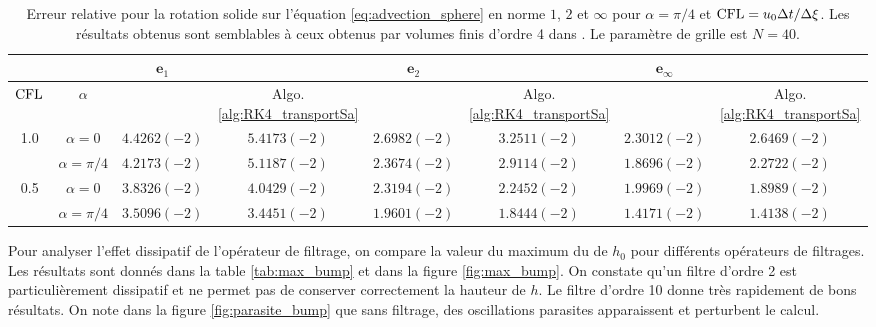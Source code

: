\begin{table}[htbp]
\begin{center}
\begin{tabular}{|cc||cc||cc||cc|}
\hline 
 & & $\mathbf{e}_1$ &   & $\mathbf{e}_2$ &   & $\mathbf{e}_{\infty}$ &   \\ 
\hline 
$\text{CFL}$ & $\alpha$ & \cite{Ullrich2010} & Algo. \ref{alg:RK4_transportSa} & \cite{Ullrich2010} & Algo. \ref{alg:RK4_transportSa} & \cite{Ullrich2010} & Algo. \ref{alg:RK4_transportSa} \\ 
\hline 
1.0 & $\alpha = 0$ & $4.4262(-2)$ & $5.4173(-2)$ & $2.6982(-2)$ & $3.2511(-2)$ & $2.3012(-2)$ & $2.6469(-2)$ \\ 

  & $\alpha = \pi / 4$ & $4.2173(-2)$ & $5.1187(-2)$ & $2.3674(-2)$ & $2.9114(-2)$ & $1.8696(-2)$ & $2.2722(-2)$ \\ 
\hline 
0.5 & $\alpha = 0$ & $3.8326(-2)$ & $4.0429(-2)$ & $2.3194(-2)$ & $2.2452(-2)$ & $1.9969(-2)$ & $1.8989(-2)$ \\ 

  & $\alpha = \pi/4$ & $3.5096(-2)$ & $3.4451(-2)$ & $1.9601(-2)$ & $1.8444(-2)$ & $1.4171(-2)$ & $1.4138(-2)$ \\ 
\hline 
\end{tabular} 
\end{center}
\caption{Erreur relative pour la rotation solide sur l'équation \eqref{eq:advection_sphere} en norme $1$, $2$ et $\infty$ pour $\alpha = \pi / 4$ et $\text{CFL} = u_0 \Delta t / \Delta \xi$. Les résultats obtenus sont semblables à ceux obtenus par volumes finis d'ordre 4 dans \cite{Ullrich2010}. Le paramètre de grille est $N=40$.}
\label{tab:comp_ullrich_bump}
\end{table} 

Pour analyser l'effet dissipatif de l'opérateur de filtrage, on compare la valeur du maximum du de $h_0$ pour différents opérateurs de filtrages. Les résultats sont donnés dans la table \ref{tab:max_bump} et dans la figure \ref{fig:max_bump}. On constate qu'un filtre d'ordre 2 est particulièrement dissipatif et ne permet pas de conserver correctement la hauteur de $h$. Le filtre d'ordre 10 donne très rapidement de bons résultats. On note dans la figure \ref{fig:parasite_bump} que sans filtrage, des oscillations parasites apparaissent et perturbent le calcul.

